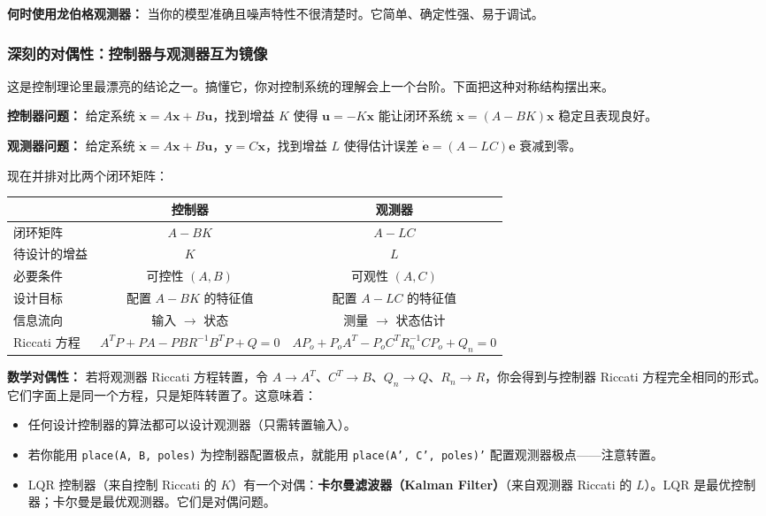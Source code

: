 \textbf{何时使用龙伯格观测器：} 当你的模型准确且噪声特性不很清楚时。它简单、确定性强、易于调试。

\subsubsection{深刻的对偶性：控制器与观测器互为镜像}

这是控制理论里最漂亮的结论之一。搞懂它，你对控制系统的理解会上一个台阶。下面把这种对称结构摆出来。

\textbf{控制器问题：} 给定系统 $\dot{\mathbf{x}} = A\mathbf{x} + B\mathbf{u}$，找到增益 $K$ 使得 $\mathbf{u} = -K\mathbf{x}$ 能让闭环系统 $\dot{\mathbf{x}} = (A - BK)\mathbf{x}$ 稳定且表现良好。

\textbf{观测器问题：} 给定系统 $\dot{\mathbf{x}} = A\mathbf{x} + B\mathbf{u}$，$\mathbf{y} = C\mathbf{x}$，找到增益 $L$ 使得估计误差 $\dot{\mathbf{e}} = (A - LC)\mathbf{e}$ 衰减到零。

现在并排对比两个闭环矩阵：

\begin{center}
\begin{tabular}{lcc}
\toprule
 & \textbf{控制器} & \textbf{观测器} \\
\midrule
闭环矩阵 & $A - BK$ & $A - LC$ \\
待设计的增益 & $K$ & $L$ \\
必要条件 & 可控性 $(A, B)$ & 可观性 $(A, C)$ \\
设计目标 & 配置 $A - BK$ 的特征值 & 配置 $A - LC$ 的特征值 \\
信息流向 & 输入 $\to$ 状态 & 测量 $\to$ 状态估计 \\
Riccati 方程 & $A^TP + PA - PBR^{-1}B^TP + Q = 0$ & $AP_o + P_oA^T - P_oC^TR_n^{-1}CP_o + Q_n = 0$ \\
\bottomrule
\end{tabular}
\end{center}

\textbf{数学对偶性：} 若将观测器 Riccati 方程转置，令 $A \to A^T$、$C^T \to B$、$Q_n \to Q$、$R_n \to R$，你会得到与控制器 Riccati 方程完全相同的形式。它们字面上是同一个方程，只是矩阵转置了。这意味着：

\begin{itemize}
    \item 任何设计控制器的算法都可以设计观测器（只需转置输入）。
    \item 若你能用 \texttt{place(A, B, poles)} 为控制器配置极点，就能用 \texttt{place(A', C', poles)'} 配置观测器极点——注意转置。
    \item LQR 控制器（来自控制 Riccati 的 $K$）有一个对偶：\textbf{卡尔曼滤波器（Kalman Filter）}（来自观测器 Riccati 的 $L$）。LQR 是最优控制器；卡尔曼是最优观测器。它们是对偶问题。
\end{itemize}

